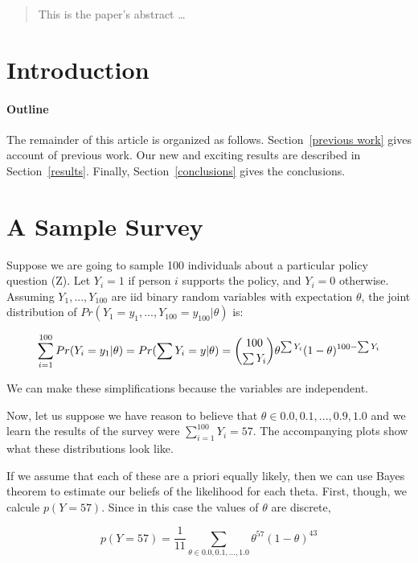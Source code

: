 \documentclass[12pt]{article}
\begin{document}
\maketitle

\begin{abstract}
This is the paper's abstract \ldots
\end{abstract}

\section{Introduction}

\paragraph{Outline}
The remainder of this article is organized as follows.
Section~\ref{previous work} gives account of previous work.
Our new and exciting results are described in Section~\ref{results}.
Finally, Section~\ref{conclusions} gives the conclusions.

\section{A Sample Survey}\label{samplesurvey}
Suppose we are going to sample 100 individuals about a particular policy question (Z). Let $Y_i=1$ if person $i$
supports the policy, and $Y_i=0$ otherwise. Assuming $Y_1,...,Y_100$ are iid binary random variables with expectation
$\theta$, the joint distribution of $Pr(Y_1=y_1,...,Y_{100}=y_{100}|\theta)$ is:

$$
\sum_{i=1}^{100} Pr(Y_i=y_1|\theta) \\
=Pr(\sum Y_i=y|\theta) \\
={100 \choose \sum Y_i}\theta^{\sum Y_i}(1-\theta)^{100-\sum Y_i}
$$

We can make these simplifications because the variables are independent.

Now, let us suppose we have reason to believe that $\theta \in {0.0,0.1,...,0.9,1.0}$ and we learn the results of the
survey were $\sum_{i=1}^{100}Y_i=57$. The accompanying plots show what these distributions look like.

If we assume that each of these are a priori equally likely, then we can use Bayes theorem to estimate our beliefs of the likelihood for each theta. First, though, we calcule $p(Y=57)$. Since in this case the values of $\theta$ are discrete,

$$
p(Y=57)=\frac{1}{11}\sum_{\theta \in {0.0,0.1,...,1.0}} \theta^{57}(1-\theta)^{43}
$$
\end{document}
